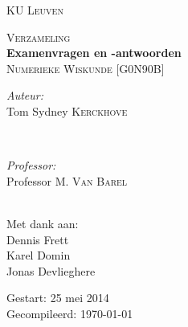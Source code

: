 \begin{titlepage}
\thispagestyle{empty}
\newcommand{\HRule}{\rule{\linewidth}{0.5mm}}
\center
\textsc{\LARGE KU Leuven}\\[1.5cm]
\vfill

\textsc{\large Verzameling}\\[0.5cm]
{ \Huge \bfseries Examenvragen en -antwoorden}\\[0.4cm]
\textsc{\large Numerieke Wiskunde [G0N90B]}\\[0.5cm]
\vfill

\begin{minipage}{0.4\textwidth}
\begin{flushleft} \large
\emph{Auteur:}\\
Tom Sydney \textsc{Kerckhove}
\end{flushleft}
\end{minipage}
~
\begin{minipage}{0.4\textwidth}
\begin{flushright} \large
\emph{Professor:} \\
Professor M. \textsc{Van Barel}\\
\end{flushright}
\end{minipage}\\[4cm]

Met dank aan:\\
{\large Dennis Frett\\Karel Domin\\Jonas Devlieghere\\}
\vfill

{\large Gestart: 25 mei 2014\\ Gecompileerd: \today}\\[3cm]
\vfill 

\end{titlepage}

